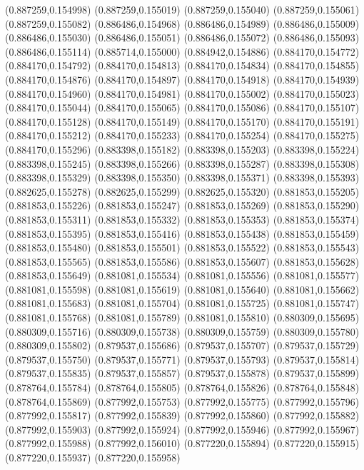 (0.887259,0.154998)
(0.887259,0.155019)
(0.887259,0.155040)
(0.887259,0.155061)
(0.887259,0.155082)
(0.886486,0.154968)
(0.886486,0.154989)
(0.886486,0.155009)
(0.886486,0.155030)
(0.886486,0.155051)
(0.886486,0.155072)
(0.886486,0.155093)
(0.886486,0.155114)
(0.885714,0.155000)
(0.884942,0.154886)
(0.884170,0.154772)
(0.884170,0.154792)
(0.884170,0.154813)
(0.884170,0.154834)
(0.884170,0.154855)
(0.884170,0.154876)
(0.884170,0.154897)
(0.884170,0.154918)
(0.884170,0.154939)
(0.884170,0.154960)
(0.884170,0.154981)
(0.884170,0.155002)
(0.884170,0.155023)
(0.884170,0.155044)
(0.884170,0.155065)
(0.884170,0.155086)
(0.884170,0.155107)
(0.884170,0.155128)
(0.884170,0.155149)
(0.884170,0.155170)
(0.884170,0.155191)
(0.884170,0.155212)
(0.884170,0.155233)
(0.884170,0.155254)
(0.884170,0.155275)
(0.884170,0.155296)
(0.883398,0.155182)
(0.883398,0.155203)
(0.883398,0.155224)
(0.883398,0.155245)
(0.883398,0.155266)
(0.883398,0.155287)
(0.883398,0.155308)
(0.883398,0.155329)
(0.883398,0.155350)
(0.883398,0.155371)
(0.883398,0.155393)
(0.882625,0.155278)
(0.882625,0.155299)
(0.882625,0.155320)
(0.881853,0.155205)
(0.881853,0.155226)
(0.881853,0.155247)
(0.881853,0.155269)
(0.881853,0.155290)
(0.881853,0.155311)
(0.881853,0.155332)
(0.881853,0.155353)
(0.881853,0.155374)
(0.881853,0.155395)
(0.881853,0.155416)
(0.881853,0.155438)
(0.881853,0.155459)
(0.881853,0.155480)
(0.881853,0.155501)
(0.881853,0.155522)
(0.881853,0.155543)
(0.881853,0.155565)
(0.881853,0.155586)
(0.881853,0.155607)
(0.881853,0.155628)
(0.881853,0.155649)
(0.881081,0.155534)
(0.881081,0.155556)
(0.881081,0.155577)
(0.881081,0.155598)
(0.881081,0.155619)
(0.881081,0.155640)
(0.881081,0.155662)
(0.881081,0.155683)
(0.881081,0.155704)
(0.881081,0.155725)
(0.881081,0.155747)
(0.881081,0.155768)
(0.881081,0.155789)
(0.881081,0.155810)
(0.880309,0.155695)
(0.880309,0.155716)
(0.880309,0.155738)
(0.880309,0.155759)
(0.880309,0.155780)
(0.880309,0.155802)
(0.879537,0.155686)
(0.879537,0.155707)
(0.879537,0.155729)
(0.879537,0.155750)
(0.879537,0.155771)
(0.879537,0.155793)
(0.879537,0.155814)
(0.879537,0.155835)
(0.879537,0.155857)
(0.879537,0.155878)
(0.879537,0.155899)
(0.878764,0.155784)
(0.878764,0.155805)
(0.878764,0.155826)
(0.878764,0.155848)
(0.878764,0.155869)
(0.877992,0.155753)
(0.877992,0.155775)
(0.877992,0.155796)
(0.877992,0.155817)
(0.877992,0.155839)
(0.877992,0.155860)
(0.877992,0.155882)
(0.877992,0.155903)
(0.877992,0.155924)
(0.877992,0.155946)
(0.877992,0.155967)
(0.877992,0.155988)
(0.877992,0.156010)
(0.877220,0.155894)
(0.877220,0.155915)
(0.877220,0.155937)
(0.877220,0.155958)
